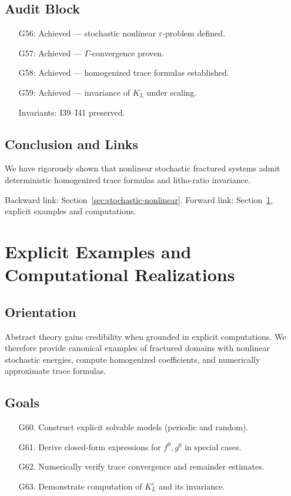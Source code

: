 \subsection{Audit Block}

\begin{itemize}
  \item[G56:] Achieved — stochastic nonlinear $\varepsilon$-problem defined.  
  \item[G57:] Achieved — $\Gamma$-convergence proven.  
  \item[G58:] Achieved — homogenized trace formulas established.  
  \item[G59:] Achieved — invariance of $K_L$ under scaling.  
  \item[Invariants:] I39–I41 preserved.  
\end{itemize}

\subsection*{Conclusion and Links}

We have rigorously shown that nonlinear stochastic fractured systems admit deterministic homogenized trace formulas and litho-ratio invariance.  

Backward link: Section~\ref{sec:stochastic-nonlinear}.  
Forward link: Section~\ref{sec:nonlinear-stochastic-examples}, explicit examples and computations.  

\section{Explicit Examples and Computational Realizations}
\label{sec:nonlinear-stochastic-examples}

\subsection*{Orientation}

Abstract theory gains credibility when grounded in explicit computations.  
We therefore provide canonical examples of fractured domains with nonlinear stochastic energies, compute homogenized coefficients, and numerically approximate trace formulas.  

\subsection*{Goals}

\begin{itemize}
  \item[G60.] Construct explicit solvable models (periodic and random).  
  \item[G61.] Derive closed-form expressions for $f^0,g^0$ in special cases.  
  \item[G62.] Numerically verify trace convergence and remainder estimates.  
  \item[G63.] Demonstrate computation of $K_L^\varepsilon$ and its invariance.  
\end{itemize}

